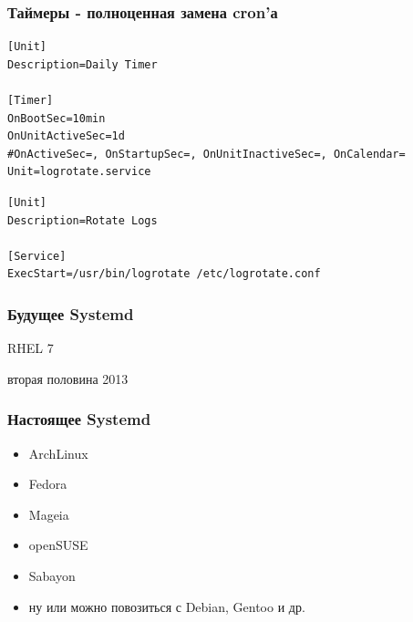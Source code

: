 \documentclass[aspectratio=169]{beamer}
\begin{document}
\begin{frame}[fragile]
  \frametitle{Таймеры - полноценная замена cron'а}

  \begin{lstlisting}[caption=/etc/systemd/system/timer-daily.timer]
[Unit]
Description=Daily Timer

[Timer]
OnBootSec=10min
OnUnitActiveSec=1d
#OnActiveSec=, OnStartupSec=, OnUnitInactiveSec=, OnCalendar=
Unit=logrotate.service
  \end{lstlisting}

  \begin{lstlisting}[caption=/etc/systemd/system/timer-daily.target.wants/logrotate.service]
[Unit]
Description=Rotate Logs

[Service]
ExecStart=/usr/bin/logrotate /etc/logrotate.conf
  \end{lstlisting}

\end{frame}


\begin{frame}
  \frametitle{Будущее Systemd}

  \begin{center}
    {\Huge RHEL 7}

    вторая половина 2013
  \end{center}
\end{frame}


\begin{frame}
  \frametitle{Настоящее Systemd}

  \begin{itemize}
  \item ArchLinux
  \item Fedora
  \item Mageia
  \item openSUSE
  \item Sabayon
  \item ну или можно повозиться с Debian, Gentoo и др.
  \end{itemize}
\end{frame}
\end{document}
